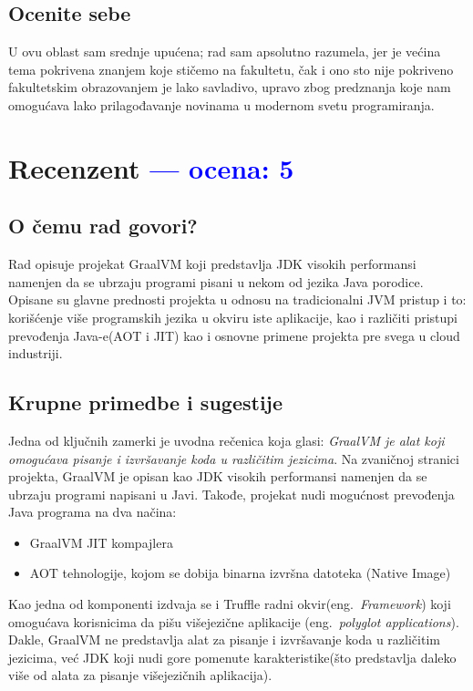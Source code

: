 \documentclass[a4paper]{report}
\newcommand{\odgovor}[1]{\textcolor{blue}{#1}}
\begin{document}
	\section{Ocenite sebe}
	U ovu oblast sam srednje upućena; rad sam apsolutno razumela, jer je većina tema pokrivena znanjem koje stičemo na fakultetu, čak i ono sto nije pokriveno fakultetskim obrazovanjem je lako savladivo, upravo zbog predznanja koje nam omogućava lako prilagođavanje novinama u modernom svetu programiranja.
	
	
\chapter{Recenzent \odgovor{--- ocena: 5} }


\section{O čemu rad govori?}
Rad opisuje projekat GraalVM koji predstavlja JDK visokih performansi namenjen da se ubrzaju programi pisani u nekom od jezika Java porodice.
Opisane su glavne prednosti projekta u odnosu na tradicionalni JVM pristup i to: korišćenje više programskih jezika u okviru iste aplikacije,
kao i različiti pristupi prevođenja Java-e(AOT i JIT) kao i osnovne primene projekta pre svega u cloud industriji.

\section{Krupne primedbe i sugestije}
Jedna od ključnih zamerki je uvodna rečenica koja glasi: \textit{GraalVM je alat koji omogućava pisanje i izvršavanje koda u različitim
jezicima}. Na zvaničnoj stranici projekta, GraalVM je opisan kao JDK visokih performansi namenjen da se ubrzaju programi napisani u Javi.
Takođe, projekat nudi mogućnost prevođenja Java programa na dva načina:
\begin{itemize}
    \item GraalVM JIT kompajlera
    \item AOT tehnologije, kojom se dobija binarna izvršna datoteka (Native Image)
\end{itemize}
Kao jedna od komponenti izdvaja se i Truffle radni okvir(eng.~{\em Framework}) koji omogućava korisnicima da pišu višejezične aplikacije 
(eng.~{\em polyglot applications}). 
Dakle, GraalVM ne predstavlja alat za pisanje i izvršavanje koda u različitim jezicima, već JDK koji nudi gore pomenute karakteristike(što 
predstavlja daleko više od alata za pisanje višejezičnih aplikacija).
\end{document}
